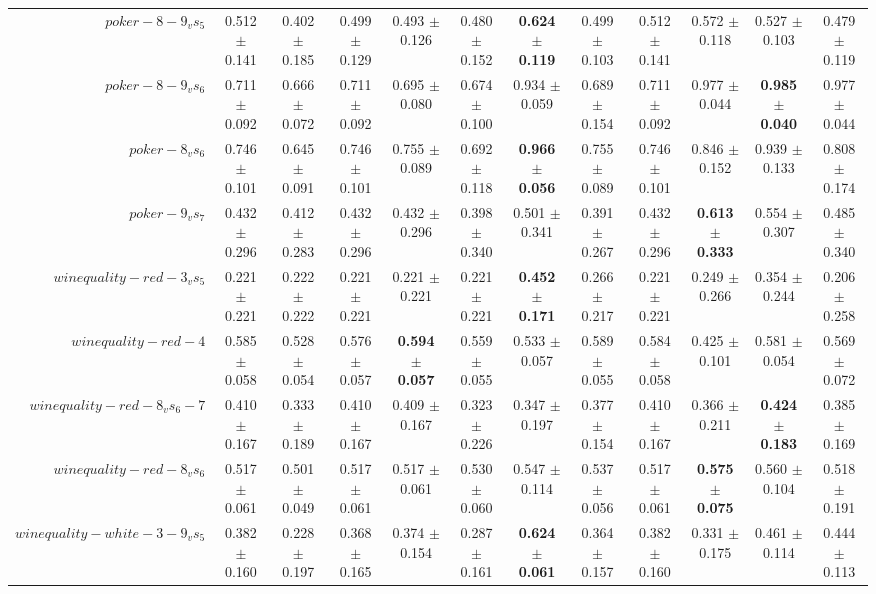 \begin{table}[!ht]
{\begin{tabular}{r c c c c c c c c c c c}
$poker-8-9_vs_5$ & 0.512 $\pm$ 0.141 & 0.402 $\pm$ 0.185 & 0.499 $\pm$ 0.129 & 0.493 $\pm$ 0.126 & 0.480 $\pm$ 0.152 & \textbf{0.624 $\pm$ 0.119} & 0.499 $\pm$ 0.103 & 0.512 $\pm$ 0.141 & 0.572 $\pm$ 0.118 & 0.527 $\pm$ 0.103 & 0.479 $\pm$ 0.119 \\
$poker-8-9_vs_6$ & 0.711 $\pm$ 0.092 & 0.666 $\pm$ 0.072 & 0.711 $\pm$ 0.092 & 0.695 $\pm$ 0.080 & 0.674 $\pm$ 0.100 & 0.934 $\pm$ 0.059 & 0.689 $\pm$ 0.154 & 0.711 $\pm$ 0.092 & 0.977 $\pm$ 0.044 & \textbf{0.985 $\pm$ 0.040} & 0.977 $\pm$ 0.044 \\
$poker-8_vs_6$ & 0.746 $\pm$ 0.101 & 0.645 $\pm$ 0.091 & 0.746 $\pm$ 0.101 & 0.755 $\pm$ 0.089 & 0.692 $\pm$ 0.118 & \textbf{0.966 $\pm$ 0.056} & 0.755 $\pm$ 0.089 & 0.746 $\pm$ 0.101 & 0.846 $\pm$ 0.152 & 0.939 $\pm$ 0.133 & 0.808 $\pm$ 0.174 \\
$poker-9_vs_7$ & 0.432 $\pm$ 0.296 & 0.412 $\pm$ 0.283 & 0.432 $\pm$ 0.296 & 0.432 $\pm$ 0.296 & 0.398 $\pm$ 0.340 & 0.501 $\pm$ 0.341 & 0.391 $\pm$ 0.267 & 0.432 $\pm$ 0.296 & \textbf{0.613 $\pm$ 0.333} & 0.554 $\pm$ 0.307 & 0.485 $\pm$ 0.340 \\
$winequality-red-3_vs_5$ & 0.221 $\pm$ 0.221 & 0.222 $\pm$ 0.222 & 0.221 $\pm$ 0.221 & 0.221 $\pm$ 0.221 & 0.221 $\pm$ 0.221 & \textbf{0.452 $\pm$ 0.171} & 0.266 $\pm$ 0.217 & 0.221 $\pm$ 0.221 & 0.249 $\pm$ 0.266 & 0.354 $\pm$ 0.244 & 0.206 $\pm$ 0.258 \\
$winequality-red-4$ & 0.585 $\pm$ 0.058 & 0.528 $\pm$ 0.054 & 0.576 $\pm$ 0.057 & \textbf{0.594 $\pm$ 0.057} & 0.559 $\pm$ 0.055 & 0.533 $\pm$ 0.057 & 0.589 $\pm$ 0.055 & 0.584 $\pm$ 0.058 & 0.425 $\pm$ 0.101 & 0.581 $\pm$ 0.054 & 0.569 $\pm$ 0.072 \\
$winequality-red-8_vs_6-7$ & 0.410 $\pm$ 0.167 & 0.333 $\pm$ 0.189 & 0.410 $\pm$ 0.167 & 0.409 $\pm$ 0.167 & 0.323 $\pm$ 0.226 & 0.347 $\pm$ 0.197 & 0.377 $\pm$ 0.154 & 0.410 $\pm$ 0.167 & 0.366 $\pm$ 0.211 & \textbf{0.424 $\pm$ 0.183} & 0.385 $\pm$ 0.169 \\
$winequality-red-8_vs_6$ & 0.517 $\pm$ 0.061 & 0.501 $\pm$ 0.049 & 0.517 $\pm$ 0.061 & 0.517 $\pm$ 0.061 & 0.530 $\pm$ 0.060 & 0.547 $\pm$ 0.114 & 0.537 $\pm$ 0.056 & 0.517 $\pm$ 0.061 & \textbf{0.575 $\pm$ 0.075} & 0.560 $\pm$ 0.104 & 0.518 $\pm$ 0.191 \\
$winequality-white-3-9_vs_5$ & 0.382 $\pm$ 0.160 & 0.228 $\pm$ 0.197 & 0.368 $\pm$ 0.165 & 0.374 $\pm$ 0.154 & 0.287 $\pm$ 0.161 & \textbf{0.624 $\pm$ 0.061} & 0.364 $\pm$ 0.157 & 0.382 $\pm$ 0.160 & 0.331 $\pm$ 0.175 & 0.461 $\pm$ 0.114 & 0.444 $\pm$ 0.113 \\

\end{tabular}}
\end{table}
